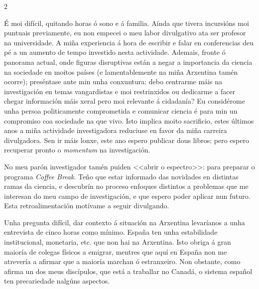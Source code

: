 \begin{multicols}{2}

É moi difícil, quitando horas ó sono e á familia. Aínda que tivera incursións
moi puntuais previamente, eu non empecei o meu labor divulgativo ata ser
profesor na universidade. A miña experiencia á hora de escribir e falar en
conferencias deu pé a un aumento de tempo investido nesta actividade. Ademais,
fronte ó panorama actual, onde figuras disruptivas están a negar a importancia
da ciencia na sociedade en moitos países (e lamentablemente na miña Arxentina
tamén ocorre); preséntase ante min unha conxuntura: debo centrarme máis na
investigación en temas vangardistas e moi restrinxidos ou dedicarme a facer
chegar información máis xeral pero moi relevante á cidadanía? Eu considérome
unha persoa politicamente comprometida e comunicar ciencia é para min
un compromiso coa sociedade na que vivo. Isto implica moito sacrificio,
estes últimos anos a miña actividade investigadora reduciuse en favor da miña
carreira divulgadora. Sen ir máis lonxe, este ano espero publicar dous libros;
pero espero recuperar pronto o \emph{momentum} na investigación.

No meu parón investigador tamén puiden <<abrir o espectro>>: para preparar o
programa \emph{Coffee Break}. Teño que estar informado das novidades en
distintas ramas da ciencia, e descubrín no proceso enfoques distintos a
problemas que me interesan do meu campo de investigación, e que espero poder
aplicar nun futuro. Esta retroalimentación motívame a seguir divulgando.


Unha pregunta difícil, dar contexto á situación na Arxentina levaríanos a unha
entrevista de cinco horas como mínimo. España ten unha estabilidade
institucional, monetaria, etc. que non hai na Arxentina. Isto obriga á gran
maioría de colegas físicos a emigrar, mentres que aquí en España non me
atrevería a afirmar que a maioría marchan ó estranxeiro. Non obstante, como
afirma un dos meus discípulos, que está a traballar no Canadá, o sistema
español ten precariedade nalgúns aspectos.


\end{multicols}
